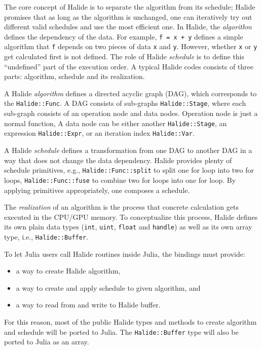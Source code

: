 \documentclass{article}
\begin{document}
The core concept of Halide is to separate the algorithm from its schedule; Halide promises that as long as the algorithm is unchanged, one can iteratively try out different valid schedules and use the most efficient one. In Halide, the \emph{algorithm} defines the dependency of the data. For example, \lstinline{f = x + y} defines a simple algorithm that \lstinline{f} depends on two pieces of data \lstinline{x} and \lstinline{y}. However, whether \lstinline{x} or \lstinline{y} get calculated first is not defined. The role of Halide \emph{schedule} is to define this ``undefined'' part of the execution order. A typical Halide codes consists of three parts: algorithm, schedule and its realization.

A Halide \emph{algorithm} defines a directed acyclic graph (DAG), which corresponds to the \lstinline{Halide::Func}. A DAG consists of sub-graphs \lstinline{Halide::Stage}, where each sub-graph consists of an operation node and data nodes. Operation node is just a normal function, A data node can be either another \lstinline{Halide::Stage}, an expression \lstinline{Halide::Expr}, or an iteration index \lstinline{Halide::Var}.

A Halide \emph{schedule} defines a transformation from one DAG to another DAG in a way that does not change the data dependency. Halide provides plenty of schedule primitives, e.g., \lstinline{Halide::Func::split} to split one for loop into two for loops, \lstinline{Halide::Func::fuse} to combine two for loops into one for loop. By applying primitives appropriately, one composes a schedule.

The \emph{realization} of an algorithm is the process that concrete calculation gets executed in the CPU/GPU memory. To conceptualize this process, Halide defines its own plain data types (\lstinline{int}, \lstinline{uint}, \lstinline{float} and \lstinline{handle}) as well as its own array type, i.e., \lstinline{Halide::Buffer}.

To let Julia users call Halide routines inside Julia, the bindings must provide:

\begin{itemize}
    \item a way to create Halide algorithm,
    \item a way to create and apply schedule to given algorithm, and
    \item a way to read from and write to Halide buffer.
\end{itemize}

For this reason, most of the public Halide types and methods to create algorithm and schedule will be ported to Julia. The \lstinline{Halide::Buffer} type will also be ported to Julia as an array.
\end{document}
